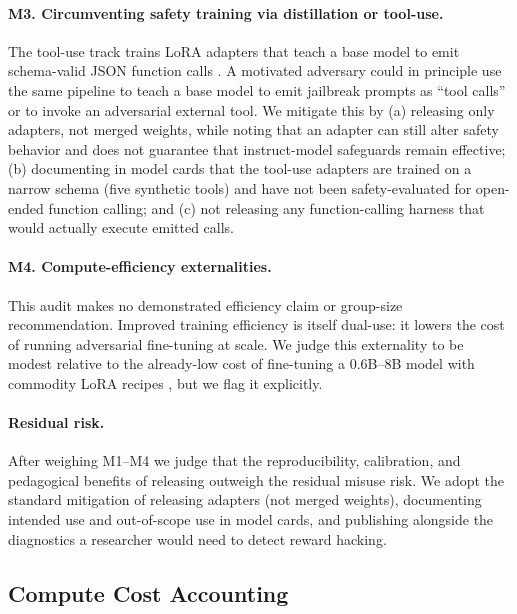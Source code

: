 \paragraph{M3. Circumventing safety training via distillation or tool-use.}
The tool-use track trains LoRA adapters that teach a base model to emit
schema-valid JSON function calls \cite{liu2024xlam}. A motivated adversary
could in principle use the same pipeline to teach a base model to emit
jailbreak prompts as ``tool calls'' or to invoke an adversarial external
tool. We mitigate this by (a) releasing only adapters, not merged weights,
while noting that an adapter can still alter safety behavior and does not
guarantee that instruct-model safeguards remain effective; (b) documenting in model
cards that the tool-use adapters are trained on a narrow schema (five
synthetic tools) and have not been safety-evaluated for open-ended function
calling; and (c) not releasing any function-calling harness that would
actually execute emitted calls.

\paragraph{M4. Compute-efficiency externalities.}
This audit makes no demonstrated efficiency claim or group-size recommendation. Improved training efficiency is
itself dual-use: it lowers the cost of running adversarial fine-tuning at
scale. We judge this externality to be modest relative to the already-low
cost of fine-tuning a 0.6B--8B model with commodity LoRA recipes
\cite{hu2022lora}, but we flag it explicitly.

\paragraph{Residual risk.}
After weighing M1--M4 we judge that the reproducibility, calibration, and
pedagogical benefits of releasing \ours{} outweigh the residual misuse
risk. We adopt the standard mitigation of releasing adapters (not merged
weights), documenting intended use and out-of-scope use in model cards,
and publishing alongside the diagnostics a researcher would need to detect
reward hacking.

\subsection{Compute Cost Accounting}
\label{sec:compute_accounting}

